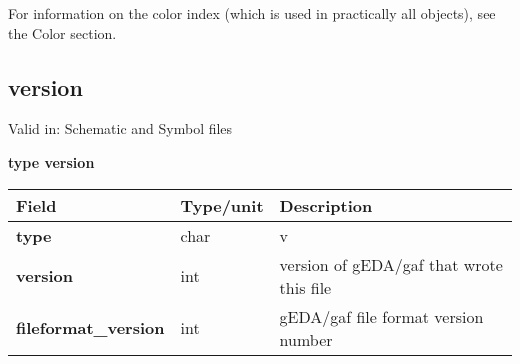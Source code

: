 \documentclass{article}
\begin{document}
For information on the color index (which is used in practically all objects),
see the Color section.

\subsection{version}

Valid in: Schematic and Symbol files

{\bf type version}

\begin{table}[h]
\begin{tabular}{|l|l|l|} \hline
Field 		& Type/unit 	& Description \\ \hline 
\hline
{\bf type} 	& char 		& v \\ \hline
{\bf version} 	& int 		& version of gEDA/gaf that wrote this file \\ \hline
{\bf fileformat\_version} 	& int 		& gEDA/gaf file format version number \\ \hline
\end{tabular}
\end{table}
\end{document}
